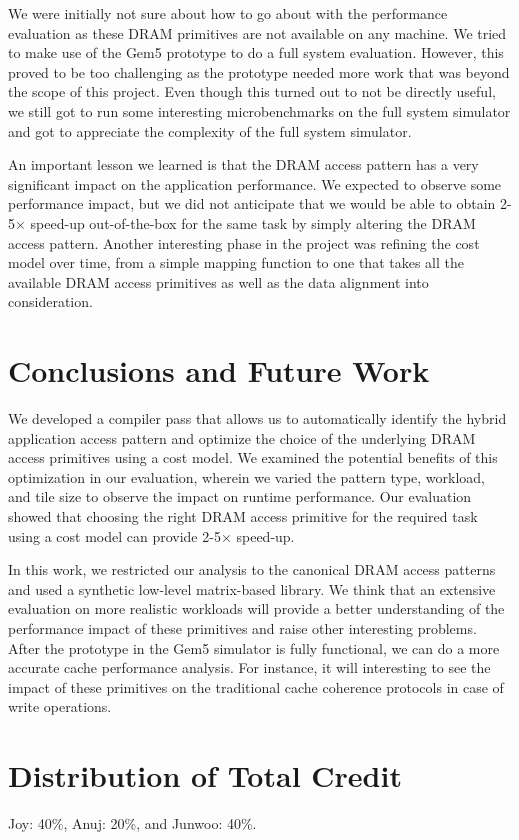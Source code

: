 \documentclass[letterpaper]{article}
\begin{document}
We were initially not sure about how to go about with the performance 
evaluation as these DRAM primitives are not available on any machine. We
tried to make use of the Gem5 prototype to do a full system evaluation. However,
this proved to be too challenging as the prototype needed more work
that was beyond the scope of this project. Even though this turned out to 
not be directly useful, we still got to run some interesting microbenchmarks on
the full system simulator and got to appreciate the complexity of the full
system simulator.

An important lesson we learned is that the DRAM access pattern has a 
very significant impact on the application performance. We expected to 
observe some performance impact, but we did not anticipate that we would
be able to obtain 2-5$\times$ speed-up out-of-the-box for the same task by
simply altering the DRAM access pattern.
Another interesting phase in the project was refining the cost model over time,
from a simple mapping function to one that takes all the available 
DRAM access primitives as well as the data alignment into consideration.

\section{Conclusions and Future Work}

We developed a compiler pass that allows us to automatically identify the hybrid
application access pattern and optimize the choice of the underlying DRAM access
primitives using a cost model.
We examined the potential benefits of this optimization in our evaluation,
wherein we varied the pattern type, workload, and tile size to observe the
impact on runtime performance.
Our evaluation showed that choosing the right DRAM access primitive for
the required task using a cost model can provide 2-5$\times$ speed-up.

In this work, we restricted our analysis to the canonical DRAM access patterns
and used a synthetic low-level matrix-based library. We think that an
extensive evaluation on more realistic workloads will provide a better 
understanding of the performance impact of these primitives and raise 
other interesting problems. After the prototype in the Gem5 simulator is
fully functional, we can do a more accurate cache performance analysis.
For instance, it will interesting to see the impact of these primitives on
the traditional cache coherence protocols in case of write operations.

\section{Distribution of Total Credit}

Joy: 40\%, Anuj: 20\%, and Junwoo: 40\%.



\end{document}

